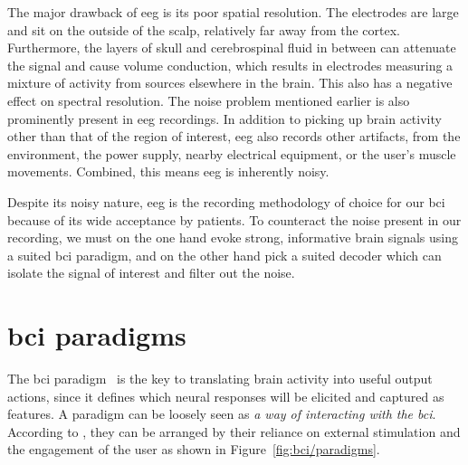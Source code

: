 The major drawback of \ac{eeg} is its poor spatial resolution.
The electrodes are large and sit on the outside of the scalp, relatively far
away from the cortex.
Furthermore, the layers of skull and cerebrospinal fluid in between can
attenuate the signal and cause volume conduction, which results in electrodes
measuring a mixture of activity from sources elsewhere in the brain.
This also has a negative effect on spectral resolution.
The noise problem mentioned earlier is also prominently present in \ac{eeg}
recordings.
In addition to picking up brain activity other than that of the region of
interest, \ac{eeg} also records other artifacts, from the environment, the power
supply, nearby electrical equipment, or the user's muscle movements.
Combined, this means \ac{eeg} is inherently noisy.

Despite its noisy nature, \ac{eeg} is the recording methodology of choice for
our \ac{bci} because of its wide acceptance by patients.
To counteract the noise present in our recording, we must on the one hand evoke
strong, informative brain signals using a suited \ac{bci} paradigm, and on the
other hand pick a suited decoder which can isolate the signal of interest and
filter out the noise.

\section{\ac{bci} paradigms}
\label{sec:bci/paradigms}

The \ac{bci} paradigm~\cite{Xu2021,Neeling2019} is the key to translating brain activity into useful
output actions, since it defines which neural responses will be elicited and
captured as features.
A paradigm can be loosely seen as \emph{a way of interacting with the
\ac{bci}}.
According to \textcite{Zander2011}, they can be arranged by their reliance on
external stimulation and the engagement of the user as shown in
Figure~\ref{fig:bci/paradigms}.

